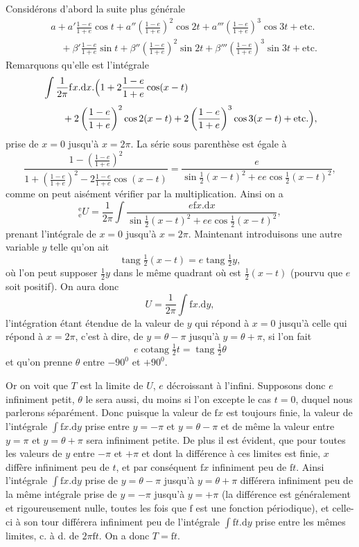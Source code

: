 \par
Considérons d’abord la suite plus générale
\[
\tag*{(U)}\begin{aligned}
&a+a'\tfrac{1-e}{1+e}\cos t+a''\left(\tfrac{1-e}{1+e}\right)^2\cos2t+a'''\left(\tfrac{1-e}{1+e}\right)^3\cos3t+\text{etc.}\\[3pt]
&\quad{}+\beta'\tfrac{1-e}{1+e}\sin t+\beta''\left(\tfrac{1-e}{1+e}\right)^2\sin2t+\beta'''\left(\tfrac{1-e}{1+e}\right)^3\sin3t+\text{etc.}
\end{aligned}
\]
\noindent Remarquons qu’elle est l’intégrale
\[
\begin{aligned}
&\int\frac{1}{2\pi}\mathrm{f}x.\mathrm{d}x.\Bigl(1+2\frac{1-e}{1+e}\cos(x-t)\\[3pt]
&\qquad{}+2\left(\frac{1-e}{1+e}\right)^2\cos2(x-t)+2\left(\frac{1-e}{1+e}\right)^3\cos3(x-t)+\text{etc.}\Bigr),
\end{aligned}
\]
\noindent prise de \(x=0\) jusqu’à \(x=2\pi\). La série sous parenthèse est égale à
\[
\frac{1-\left(\frac{1-e}{1+e}\right)^2}{1+\left(\frac{1-e}{1+e}\right)^2-2\frac{1-e}{1+e}\cos(x-t)}
=\frac{e}{\sin\tfrac12(x-t)^2+ee\cos\tfrac12(x-t)^2},
\]
\noindent comme on peut aisément vérifier par la multiplication. Ainsi on a
\[
{}^{\mathrm{e}}_{\mathrm{e}}\!U=\frac{1}{2\pi}\int\frac{e\mathrm{f}x.\mathrm{d}x}{\sin\tfrac12(x-t)^2+ee\cos\tfrac12(x-t)^2},
\]
\noindent prenant l’intégrale de \(x=0\) jusqu’à \(x=2\pi\). Maintenant introduisons une autre variable \(y\) telle qu’on ait
\[
\operatorname{tang}\tfrac12(x-t)=e\operatorname{tang}\tfrac12y,
\]
\noindent où l’on peut supposer \(\tfrac12y\) dans le même quadrant où est \(\tfrac12(x-t)\) (pourvu que \(e\) soit positif). On aura donc
\[
U=\frac{1}{2\pi}\int\mathrm{f}x.\mathrm{d}y,
\]
\noindent l’intégration étant étendue de la valeur de \(y\) qui répond à \(x=0\) jusqu’à celle qui répond à \(x=2\pi\), c’est à dire, de \(y=\theta-\pi\) jusqu’à \(y=\theta+\pi\), si l’on fait
\[
e\operatorname{cotang}\tfrac12t=\operatorname{tang}\tfrac12\theta
\]
\noindent et qu’on prenne \(\theta\) entre \(-90^0\) et \(+90^0\).
\par
Or on voit que \(T\) est la limite de \(U\), \(e\) décroissant à l’infini. Supposons donc \(e\) infiniment petit, \(\theta\) le sera aussi, du moins si l’on excepte le cas \(t=0\), duquel nous parlerons séparément. Donc puisque la valeur de \(\mathrm{f}x\) est toujours finie, la valeur de l’intégrale \(\int\mathrm{f}x.\mathrm{d}y\) prise entre \(y=-\pi\) et \(y=\theta-\pi\) et de même la valeur entre \(y=\pi\) et \(y=\theta+\pi\) sera infiniment petite. De plus il est évident, que pour toutes les valeurs de \(y\) entre \(-\pi\) et \(+\pi\) et dont la différence à ces limites est finie, \(x\) diffère infiniment peu de \(t\), et par conséquent \(\mathrm{f}x\) infiniment peu de \(\mathrm{f}t\). Ainsi l’intégrale \(\int\mathrm{f}x.\mathrm{d}y\) prise de \(y=\theta-\pi\) jusqu’à \(y=\theta+\pi\) différera infiniment peu de la même intégrale prise de \(y=-\pi\) jusqu’à \(y=+\pi\) (la différence est généralement et rigoureusement nulle, toutes les fois que \(\mathrm{f}\) est une fonction périodique), et celle-ci à son tour différera infiniment peu de l’intégrale \(\int\mathrm{f}t.\mathrm{d}y\) prise entre les mêmes limites, c. à d. de \(2\pi\mathrm{f}t\). On a donc \(T=\mathrm{f}t\).
